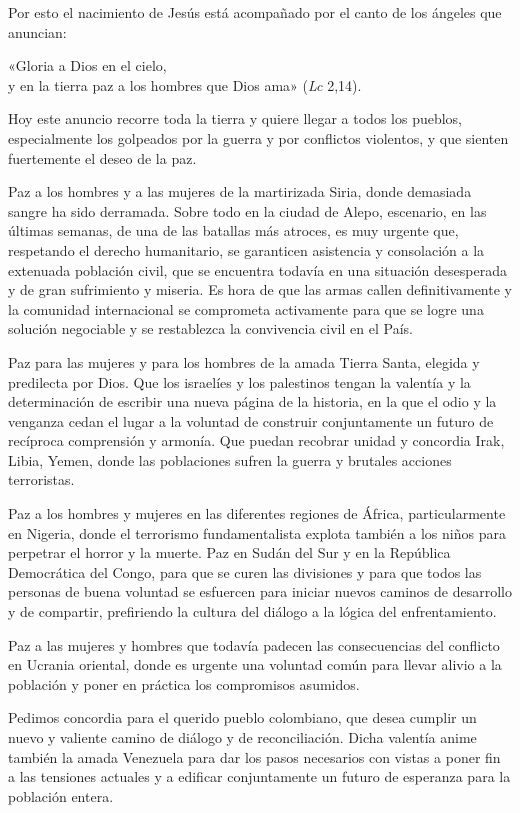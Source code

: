 Por esto el nacimiento de Jesús está acompañado por el canto de los
ángeles que anuncian:

«Gloria a Dios en el cielo,\\
y en la tierra paz a los hombres que Dios ama» (\emph{Lc} 2,14).

Hoy este anuncio recorre toda la tierra y quiere llegar a todos los
pueblos, especialmente los golpeados por la guerra y por conflictos
violentos, y que sienten fuertemente el deseo de la paz.

Paz a los hombres y a las mujeres de la martirizada Siria, donde
demasiada sangre ha sido derramada. Sobre todo en la ciudad de Alepo,
escenario, en las últimas semanas, de una de las batallas más atroces,
es muy urgente que, respetando el derecho humanitario, se garanticen
asistencia y consolación a la extenuada población civil, que se
encuentra todavía en una situación desesperada y de gran sufrimiento y
miseria. Es hora de que las armas callen definitivamente y la comunidad
internacional se comprometa activamente para que se logre una solución
negociable y se restablezca la convivencia civil en el País.

Paz para las mujeres y para los hombres de la amada Tierra Santa,
elegida y predilecta por Dios. Que los israelíes y los palestinos tengan
la valentía y la determinación de escribir una nueva página de la
historia, en la que el odio y la venganza cedan el lugar a la voluntad
de construir conjuntamente un futuro de recíproca comprensión y armonía.
Que puedan recobrar unidad y concordia Irak, Libia, Yemen, donde las
poblaciones sufren la guerra y brutales acciones terroristas.

Paz a los hombres y mujeres en las diferentes regiones de África,
particularmente en Nigeria, donde el terrorismo fundamentalista explota
también a los niños para perpetrar el horror y la muerte. Paz en Sudán
del Sur y en la República Democrática del Congo, para que se curen las
divisiones y para que todos las personas de buena voluntad se esfuercen
para iniciar nuevos caminos de desarrollo y de compartir, prefiriendo la
cultura del diálogo a la lógica del enfrentamiento.

Paz a las mujeres y hombres que todavía padecen las consecuencias del
conflicto en Ucrania oriental, donde es urgente una voluntad común para
llevar alivio a la población y poner en práctica los compromisos
asumidos.

Pedimos concordia para el querido pueblo colombiano, que desea cumplir
un nuevo y valiente camino de diálogo y de reconciliación. Dicha
valentía anime también la amada Venezuela para dar los pasos necesarios
con vistas a poner fin a las tensiones actuales y a edificar
conjuntamente un futuro de esperanza para la población entera.


